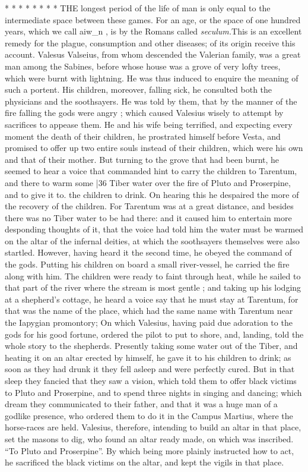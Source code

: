 * * * * * * * * THE longest period of the life of man is only equal to the intermediate space between these games. For an age, or the space of one hundred years, which we call
aiw\_n , is by the Romans called \emph{seculum.}This is an excellent remedy for the plague, consumption and other diseases; of its origin receive this account. Valesus Valseius, from whom descended the Valerian family, was a great man among the Sabines, before whose house was a grove of very lofty trees, which were burnt with lightning. He was thus induced to enquire the meaning of such a portent. His children, moreover, falling sick, he consulted both the physicians and the soothsayers. He was told by them, that by the manner of the fire falling the gods were angry ; which caused Valesius wisely to attempt by sacrifices to appease them. He and his wife being terrified, and expecting every moment the death of their children, he prostrated himself before Vesta, and promised to offer up two entire souls instead of their children, which were his own and that of their mother. But turning to the grove that had been burnt, he seemed to hear a voice that commanded hint to carry the children to Tarentum, and there to warm some
|36 Tiber water over the fire of Pluto and Proserpine, and to give it to. the children to drink. On hearing this he despaired the more of the recovery of the children. For Tarentum was at a great distance, and besides there was no Tiber water to be had there: and it caused him to entertain more desponding thoughts of it, that the voice had told him the water must be warmed on the altar of the infernal deities, at which the soothsayers themselves were also startled. However, having heard it the second time, he obeyed the command of the gods. Putting his children on board a small river-vessel, he carried the fire along with him. The children were ready to faint through heat, while he sailed to that part of the river where the stream is most gentle ; and taking up his lodging at a shepherd's cottage, he heard a voice say that he must stay at Tarentum, for that was the name of the place, which had the same name with Tarentum near the Iapygian promontory; On which Valesius, having paid due adoration to the gods for his good fortune, ordered the pilot to put to shore, and, landing, told the whole story to the shepherds. Presently taking some water out of the Tiber, and heating it on an altar erected by himself, he gave it to his children to drink; as soon as they had drunk it they fell asleep and were perfectly cured. But in that sleep they fancied that they saw a vision, which told them to offer black victims to Pluto and Proserpine, and to spend three nights in singing and dancing; which dream they communicated to their father, and that it was a huge man of a godlike presence, who ordered them to do it in the Campus Martius, where the horse-races are held. Valesius, therefore, intending to build an altar in that place, set the masons to dig, who found an altar ready made, on which was inscribed. ``To Pluto and Proserpine''. By which being more plainly instructed how to act, he sacrificed the black victims on the altar, and kept the vigils in that place.

